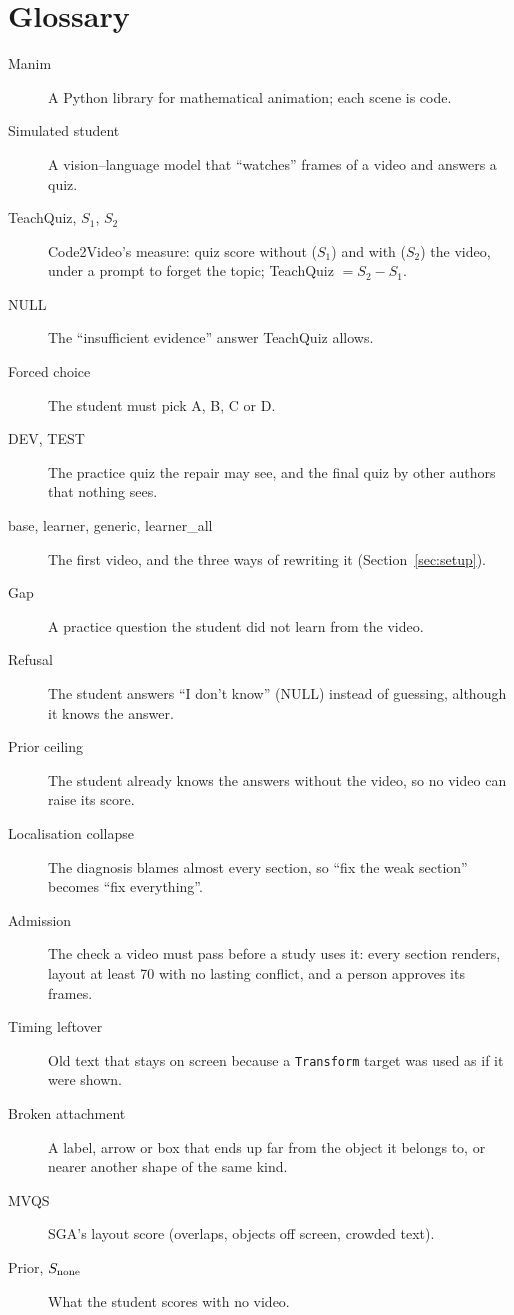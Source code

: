 \documentclass[11pt]{article}
\begin{document}
\section*{Glossary}
\begin{description}
  \item[Manim] A Python library for mathematical animation; each scene is code.
  \item[Simulated student] A vision--language model that ``watches'' frames of a video and answers a quiz.
  \item[TeachQuiz, $S_1$, $S_2$] Code2Video's measure: quiz score without ($S_1$) and with ($S_2$) the video, under a
  prompt to forget the topic; TeachQuiz $= S_2 - S_1$.
  \item[NULL] The ``insufficient evidence'' answer TeachQuiz allows.
  \item[Forced choice] The student must pick A, B, C or D.
  \item[DEV, TEST] The practice quiz the repair may see, and the final quiz by other authors that nothing sees.
  \item[base, learner, generic, learner\_all] The first video, and the three ways of rewriting it
  (Section~\ref{sec:setup}).
  \item[Gap] A practice question the student did not learn from the video.
  \item[Refusal] The student answers ``I don't know'' (NULL) instead of guessing, although it knows the answer.
  \item[Prior ceiling] The student already knows the answers without the video, so no video can raise its score.
  \item[Localisation collapse] The diagnosis blames almost every section, so ``fix the weak section'' becomes ``fix
  everything''.
  \item[Admission] The check a video must pass before a study uses it: every section renders, layout at least 70 with
  no lasting conflict, and a person approves its frames.
  \item[Timing leftover] Old text that stays on screen because a \texttt{Transform} target was used as if it were
  shown.
  \item[Broken attachment] A label, arrow or box that ends up far from the object it belongs to, or nearer another
  shape of the same kind.
  \item[MVQS] SGA's layout score (overlaps, objects off screen, crowded text).
  \item[Prior, $S_{\text{none}}$] What the student scores with no video.

\end{description}
\end{document}
